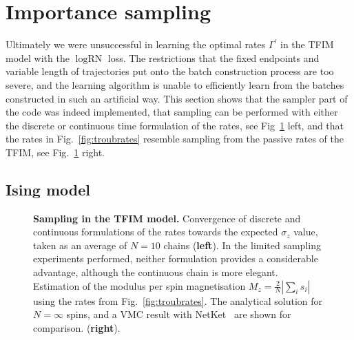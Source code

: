 \section{Importance sampling}
\label{subsec:impsampl}
Ultimately we were unsuccessful in learning the optimal rates $\Gamma^\prime$ in the TFIM model with the $\log {\text{RN}}$ loss. The restrictions that the fixed endpoints and variable length of trajectories put onto the batch construction process are too severe, and the learning algorithm is unable to efficiently learn from the batches constructed in such an artificial way. This section shows that the sampler part of the code was indeed implemented, that sampling can be performed with either the discrete or continuous time formulation of the rates, see Fig~\ref{fig:sampling_tfim1d} left, and that the rates in Fig.~\ref{fig:troubrates} resemble sampling from the passive rates of the TFIM, see Fig.~\ref{fig:sampling_tfim1d} right.

\subsection{Ising model}

\begin{figure}[H]
	\centering
	\quad
	\caption[Sampling in the TFIM model]{\textbf{Sampling in the TFIM model.} Convergence of discrete and continuous formulations of the rates towards the expected $\sigma_z$ value, taken as an average of $N=10$ chains (\textbf{left}). In the limited sampling experiments performed,  neither formulation provides a considerable advantage, although the continuous chain is more elegant. Estimation of the modulus per spin magnetisation $M_z=\frac{2}{N}\left|\sum_{i} s_{i}\right|$ using the rates from Fig.~\ref{fig:troubrates}. The analytical solution for $N=\infty$ spins, and a VMC result with NetKet~\cite{netket2019} are shown for comparison. (\textbf{right}).}
	\label{fig:sampling_tfim1d}
\end{figure}

